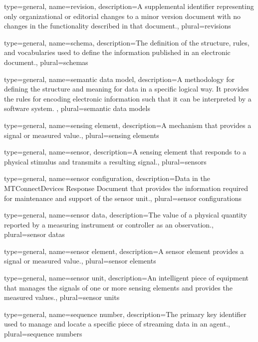 {
	type={general},
    name={revision},
	description={A supplemental identifier representing only organizational or editorial changes to a \gls{minor} version document with no changes in the functionality described in that document.},
	plural={revisions}
}

{
	type={general},
    name={schema},
	description={The definition of the structure, rules, and vocabularies used to define the information published in an electronic document.},
	plural={schemas}
}

{
	type={general},
    name={semantic data model},
	description={A methodology for defining the structure and meaning for data in a specific logical way. It provides the rules for encoding electronic information such that it can be interpreted by a software system. },
	plural={semantic data models}
}

{
	type={general},
    name={sensing element},
	description={A mechanism that provides a signal or measured value.},
	plural={sensing elements}
}

{
	type={general},
    name={sensor},
	description={A \gls{sensing element} that responds to a physical stimulus and transmits a resulting signal.},
	plural={sensors}
}

{
	type={general},
    name={sensor configuration},
	description={Data in the \gls{MTConnectDevices Response Document} that provides the information required for maintenance and support of the \gls{sensor unit}.},
	plural={sensor configurations}
}

{
	type={general},
    name={sensor data},
	description={The value of a physical quantity reported by a measuring instrument or controller as an \gls{observation}.},
	plural={sensor datas}
}

{
	type={general},
    name={sensor element},
	description={A \gls{sensor element} provides a signal or measured value.},
	plural={sensor elements}
}

{
	type={general},
    name={sensor unit},
	description={An intelligent piece of equipment that manages the signals of one or more \glspl{sensing element} and provides the measured values.},
	plural={sensor units}
}

{
	type={general},
    name={sequence number},
	description={The primary key identifier used to manage and locate a specific piece of \gls{streaming data} in an \gls{agent}.},
	plural={sequence numbers}
}

